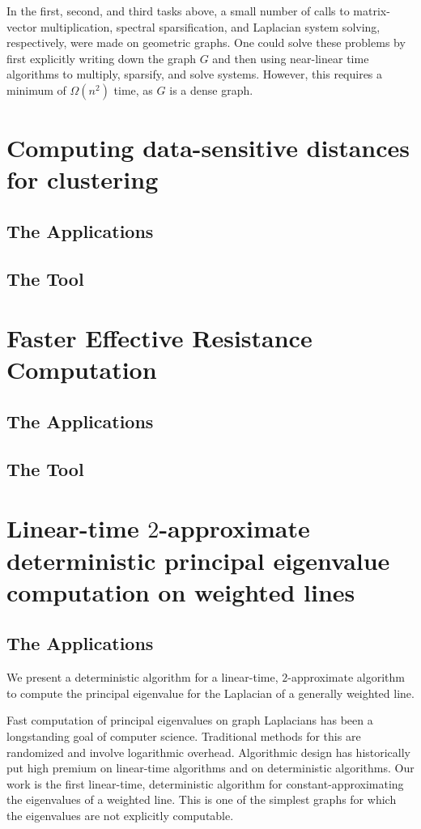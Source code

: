 In the first, second, and third tasks above, a small number of calls to
matrix-vector multiplication, spectral sparsification, and Laplacian
system solving, respectively, were made on geometric graphs. One could
solve these problems by first explicitly writing down the graph $G$ and
then using near-linear time algorithms \cite{ss11,ckmpprx14} to
multiply, sparsify, and solve systems. However, this requires a minimum
of $\Omega(n^2)$ time, as $G$ is a dense graph.

\section{Computing data-sensitive distances for clustering}
\subsection{The Applications}

\subsection{The Tool}

\section{Faster Effective Resistance Computation}
\subsection{The Applications}
\subsection{The Tool}
\section{Linear-time $2$-approximate deterministic principal eigenvalue computation on
    weighted lines}
\subsection{The Applications}
We present a deterministic algorithm for a linear-time, $2$-approximate
algorithm to compute the principal eigenvalue for the Laplacian of a generally weighted
line. 

  Fast computation of principal eigenvalues on graph Laplacians has been
  a longstanding goal of computer science. Traditional methods for this
  are randomized and involve logarithmic overhead. Algorithmic design
  has historically put high premium on linear-time algorithms and on
  deterministic algorithms. Our work is the first linear-time,
  deterministic algorithm for constant-approximating the eigenvalues of
  a weighted line. This is one of the simplest graphs for which the eigenvalues
  are not explicitly computable.
  
